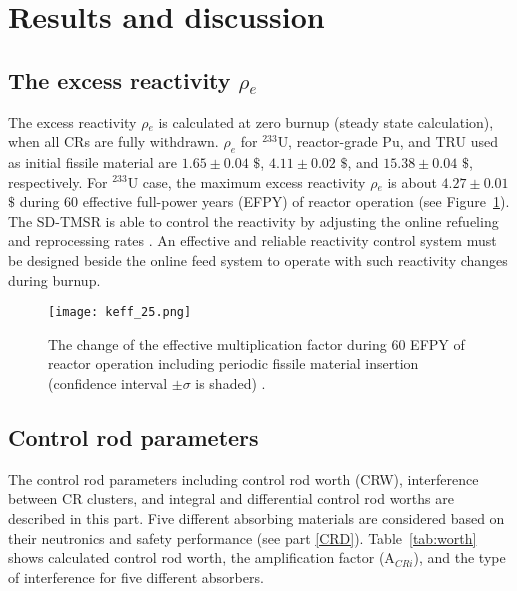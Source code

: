 \section{Results and discussion} \label{Results-and-discussion}

\subsection{The excess reactivity $\rho$$_e$}

The excess reactivity $\rho$$_e$ is calculated at zero burnup (steady state 
calculation), when all CRs are fully withdrawn. $\rho_e$ for $^{233}$U, 
reactor-grade Pu, and TRU used as initial fissile material are $1.65\pm0.04$ 
$\$$, $4.11\pm0.02$ $\$$, and $15.38\pm0.04$ $\$$, respectively. For $^{233}$U 
case, the maximum excess reactivity $\rho$$_e$ is about $4.27\pm0.01$ $\$$ 
during 60 effective full-power years (EFPY) of reactor operation (see 
Figure~\ref{fig:keff_25}). 
The SD-TMSR is able to control the reactivity by adjusting the online 
refueling and reprocessing rates \cite{ashraf2019whole_core}. An effective and 
reliable reactivity control system must be designed beside the online feed 
system to operate with such reactivity changes during burnup.

\begin{figure}
	\centering
	\texttt{[image: keff\_25.png]}
	\vspace{-0.5in}
	\caption{The change of the effective multiplication factor during 60 EFPY of reactor operation including periodic fissile material insertion (confidence interval $\pm\sigma$ is shaded) \cite{ashraf2019whole_core}.} 
	\label{fig:keff_25}
\end{figure}

\subsection{Control rod parameters}

The control rod parameters including control rod worth (CRW), interference 
between CR clusters, and integral and differential control rod worths are 
described in this part. Five different absorbing materials are considered based 
on their neutronics and safety performance (see part \ref{CRD}). 
Table~\ref{tab:worth} shows calculated control rod worth, the amplification 
factor (A$_{CRi}$), and the type of interference for five different 
absorbers.

